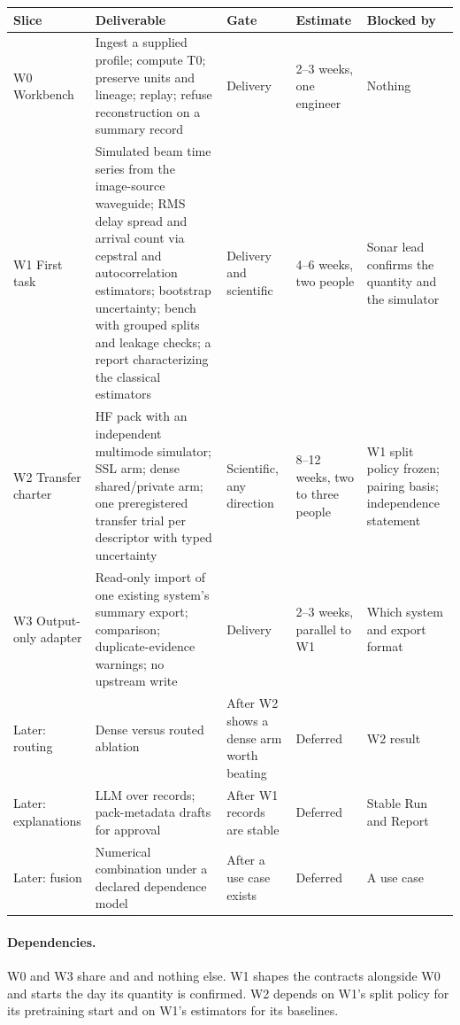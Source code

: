 \documentclass[11pt,a4paper]{article}
\begin{document}
\begin{center}\small
\begin{tabular}{@{}p{2.2cm}p{5cm}p{2.6cm}p{2.2cm}p{2.4cm}@{}}
\toprule
Slice & Deliverable & Gate & Estimate & Blocked by \\
\midrule
W0 Workbench & Ingest a supplied profile; compute T0; preserve units and lineage; replay; refuse reconstruction on a summary record & Delivery & 2--3 weeks, one engineer & Nothing \\
W1 First task & Simulated beam time series from the image-source waveguide; RMS delay spread and arrival count via cepstral and autocorrelation estimators; bootstrap uncertainty; bench with grouped splits and leakage checks; a report characterizing the classical estimators & Delivery and scientific & 4--6 weeks, two people & Sonar lead confirms the quantity and the simulator \\
W2 Transfer charter & HF pack with an independent multimode simulator; SSL arm; dense shared/private arm; one preregistered transfer trial per descriptor with typed uncertainty & Scientific, any direction & 8--12 weeks, two to three people & W1 split policy frozen; pairing basis; independence statement \\
W3 Output-only adapter & Read-only import of one existing system's summary export; comparison; duplicate-evidence warnings; no upstream write & Delivery & 2--3 weeks, parallel to W1 & Which system and export format \\
Later: routing & Dense versus routed ablation & After W2 shows a dense arm worth beating & Deferred & W2 result \\
Later: explanations & LLM over records; pack-metadata drafts for approval & After W1 records are stable & Deferred & Stable Run and Report \\
Later: fusion & Numerical combination under a declared dependence model & After a use case exists & Deferred & A use case \\
\bottomrule
\end{tabular}
\end{center}

\paragraph{Dependencies.} W0 and W3 share  and  and nothing else. W1 shapes the contracts alongside W0 and starts the day its quantity is confirmed. W2 depends on W1's split policy for its pretraining start and on W1's estimators for its baselines.
\end{document}

